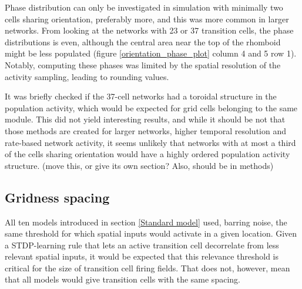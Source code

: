 \documentclass{article}
\begin{document}
    Phase distribution can only be investigated in simulation with minimally two cells sharing orientation, preferably more, and this was more common in larger networks. From looking at the networks with 23 or 37 transition cells, the phase distributions is even, although the central area near the top of the rhomboid might be less populated (figure \ref{orientation_phase_plot} column 4 and 5 row 1). Notably, computing these phases was limited by the spatial resolution of the activity sampling, leading to rounding values.
    
    It was briefly checked if the 37-cell networks had a toroidal structure in the population activity, which would be expected for grid cells belonging to the same module. This did not yield interesting results, and while it should be not that those methods are created for larger networks, higher temporal resolution and rate-based network activity, it seems unlikely that networks with at most a third of the cells sharing orientation would have a highly ordered population activity structure. (move this, or give its own section? Also, should be in methods)

    \subsection{Gridness spacing} \label{Spacing}

    All ten models introduced in section \ref{Standard model} used, barring noise, the same threshold for which spatial inputs would activate in a given location. Given a STDP-learning rule that lets an active transition cell decorrelate from less relevant spatial inputs, it would be expected that this relevance threshold is critical for the size of transition cell firing fields. That does not, however, mean that all models would give transition cells with the same spacing.
\end{document}
